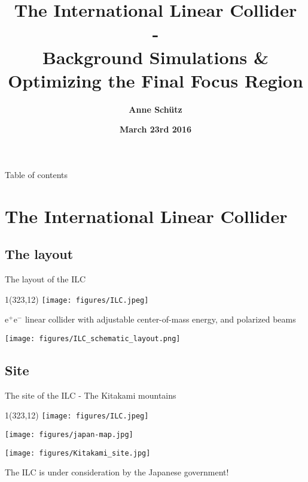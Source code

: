 \documentclass[xcolor={dvipsnames}]{beamer}
\title[ILC \& Background Simulations]{\textbf{\LARGE The International Linear Collider \\ \normalsize- \\ \small Background Simulations \& Optimizing the Final Focus Region}}
\author{\textbf{Anne Sch\"utz}}
\institute{\textbf{KIT, DESY}}
\date{\textbf{March 23rd 2016}}
\newcommand{\ilclogo}{
  \setlength{\TPHorizModule}{1pt}
  \setlength{\TPVertModule}{1pt}
  \begin{textblock}{1}(323,12)
   \texttt{[image: figures/ILC.jpeg]}
  \end{textblock}
}
\begin{document}
{
\begin{frame}
  \titlepage
\end{frame}
}

\begin{frame}{Table of contents}
  \tableofcontents
\end{frame}

\section{The International Linear Collider}
\subsection{The layout}
\begin{frame}{The layout of the ILC}
\ilclogo

e$^+$e$^-$ linear collider with adjustable center-of-mass energy, and polarized beams\\
\begin{center}
\texttt{[image: figures/ILC\_schematic\_layout.png]}
\end{center}
\begin{flushright}
 \href{https://www.youtube.com/watch?v=ep5496vdEFI}{}
\end{flushright}

\end{frame}

\subsection{Site}

\begin{frame}{The site of the ILC - The Kitakami mountains}
\ilclogo
\begin{center}
\begin{minipage}[t]{0.49\textwidth}
\centering
 \texttt{[image: figures/japan-map.jpg]}
\end{minipage}
\begin{minipage}[t]{0.48\textwidth}
\centering
   \texttt{[image: figures/Kitakami\_site.jpg]}
\end{minipage}
\begin{block}{}
 The ILC is under consideration by the Japanese government!
\end{block}

\end{center}
\end{frame}
\end{document}
